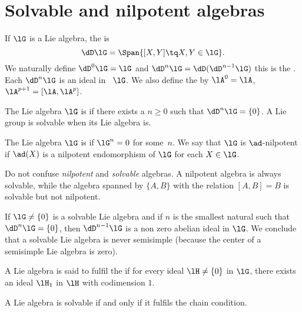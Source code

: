 \section{Solvable and nilpotent algebras}

If $\lG$ is a Lie algebra, the  is
\[
	\dD\lG=\Span\{[X,Y]\tq X,Y\in\lG\}.
\]
We naturally define $\dD^0\lG=\lG$ and $\dD^n\lG=\dD(\dD^{n-1}\lG)$ this is the . Each $\dD^n\lG$ is an ideal in~ $\lG$. We also define the  by $\lA^0=\lA$, $\lA^{p+1}=[\lA,\lA^p]$.

\begin{definition}
	The Lie algebra $\lG$ is  if there exists a $n\geq 0$ such that $\dD^n\lG=\{0\}$. A Lie group is solvable when its Lie algebra is.

	The Lie algebra  \( \lG\) is  if \( \lG^n=0\) for some~\( n\). We say that \( \lG\) is \( \ad\)-nilpotent if \( \ad(X)\) is a nilpotent endomorphism of \( \lG\) for each \( X\in\lG\).
\end{definition}

Do not confuse \emph{nilpotent} and \emph{solvable} algebras. A nilpotent algebra is always solvable, while the algebra spanned by $\{ A,B \}$ with the relation $[A,B]=B$ is solvable but not nilpotent.

If $\lG\neq\{0\}$ is a solvable Lie algebra and if $n$ is the smallest natural such that $\dD^n\lG=\{0\}$, then $\dD^{n-1}\lG$ is a non zero abelian ideal in $\lG$. We conclude that a solvable Lie algebra is never semisimple (because the center of a semisimple Lie algebra is zero).

A Lie algebra is said to fulfil the  if for every ideal $\lH\neq\{0\}$ in $\lG$, there exists an ideal $\lH_1$ in $\lH$ with codimension $1$.

\begin{lemma}
	A Lie algebra is solvable if and only if it fulfils the chain condition.
\end{lemma}

